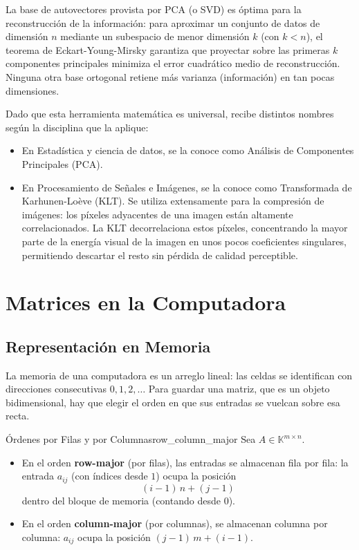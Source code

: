 \documentclass[11pt, a4paper]{article}
\begin{document}
\obs La base de autovectores provista por PCA (o SVD) es óptima para la reconstrucción de la información: para aproximar un conjunto de datos de dimensión $n$ mediante un subespacio de menor dimensión $k$ (con $k < n$), el teorema de Eckart-Young-Mirsky garantiza que proyectar sobre las primeras $k$ componentes principales minimiza el error cuadrático medio de reconstrucción. Ninguna otra base ortogonal retiene más varianza (información) en tan pocas dimensiones.

\obs Dado que esta herramienta matemática es universal, recibe distintos nombres según la disciplina que la aplique:
\begin{itemize}
    \item En Estadística y ciencia de datos, se la conoce como Análisis de Componentes Principales (PCA).
    \item En Procesamiento de Señales e Imágenes, se la conoce como Transformada de Karhunen-Loève (KLT). Se utiliza extensamente para la compresión de imágenes: los píxeles adyacentes de una imagen están altamente correlacionados. La KLT decorrelaciona estos píxeles, concentrando la mayor parte de la energía visual de la imagen en unos pocos coeficientes singulares, permitiendo descartar el resto sin pérdida de calidad perceptible.
\end{itemize}

\newpage

\section{Matrices en la Computadora}

\subsection{Representación en Memoria}

La memoria de una computadora es un arreglo lineal: las celdas se identifican con direcciones consecutivas $0, 1, 2, \dots$ Para guardar una matriz, que es un objeto bidimensional, hay que elegir el orden en que sus entradas se vuelcan sobre esa recta.

\begin{definicion}{Órdenes por Filas y por Columnas}{row_column_major}
Sea $A \in \mathbb{K}^{m \times n}$.
\begin{itemize}
    \item En el orden \textbf{row-major} (por filas), las entradas se almacenan fila por fila: la entrada $a_{ij}$ (con índices desde $1$) ocupa la posición
    \[
    (i-1) \, n + (j-1)
    \]
    dentro del bloque de memoria (contando desde $0$).
    \item En el orden \textbf{column-major} (por columnas), se almacenan columna por columna: $a_{ij}$ ocupa la posición $(j-1) \, m + (i-1)$.
\end{itemize}
\end{definicion}
\end{document}
